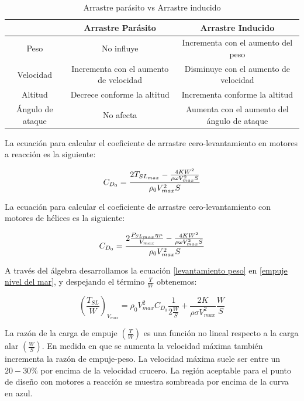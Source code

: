 \begin{table}[h]
    \centering
    \resizebox{14cm}{!} {
    \begin{tabular}{|c|c|c|}
    \hline
         & \textbf{Arrastre Parásito } & \textbf{Arrastre Inducido}\\
         \hline
      Peso   &  No influye & Incrementa con el aumento del peso\\
      Velocidad & Incrementa con el aumento de velocidad & Disminuye con el aumento de velocidad\\
      Altitud & Decrece conforme la altitud  & Incrementa conforme la altitud\\
      Ángulo de ataque & No afecta & Aumenta con el aumento del ángulo de ataque\\
      \hline
    \end{tabular}
    }
    \caption{Arrastre parásito vs Arrastre inducido}
    \label{Arrastre parásito vs Arrastre inducido}
\end{table}

La ecuación para calcular el coeficiente de arrastre cero-levantamiento en motores a reacción es la siguiente:

\begin{equation}
    C_{D_0} = \frac{2 T_{SL_{max}} - \frac{4 K W^2}{\rho \omega V_{max}^2 S}} {{\rho_{0} V_{max}^2 S}}\\
\end{equation}

La ecuación para calcular el coeficiente de arrastre cero-levantamiento con motores de hélices es la siguiente:

\begin{equation}
    C_{D_0} = \frac{2 \frac{P_{SL_{max}} \eta_{P}}{V_{max}}  - \frac{4 K W^2}{\rho \omega V_{max}^2 S}} {\rho_{0} V_{max}^2 S} \\
\end{equation}

\medskip

A través del álgebra desarrollamos la ecuación \ref{levantamiento peso} en \ref{empuje nivel del mar}, y despejando el término $\frac{T}{W}$ obtenemos:

\begin{equation}
    (\frac{T_{SL}}{W})_{V_{max}} = \rho_0 V_{max}^2 C_{D_{0}} \frac{1}{2 \frac{W}{S}} + \frac{2K}{\rho \sigma V_{max}^2} \frac{W}{S}
\end{equation}

La razón de la carga de empuje $(\frac{T}{W})$ es una función no lineal respecto a la carga alar $(\frac{W}{S})$. En medida en que se aumenta la velocidad máxima también incrementa la razón de empuje-peso. 
La velocidad máxima suele ser entre un $20-30 \%$ por encima de la velocidad crucero.
La región aceptable para el punto de diseño con motores a reacción se muestra sombreada por encima de la curva en azul.

